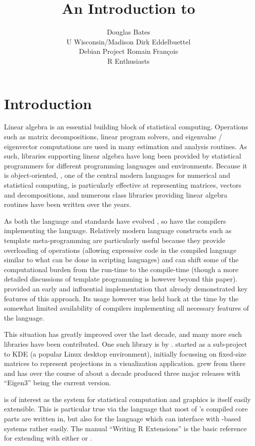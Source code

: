 \documentclass[shortnames,article]{jss}
\author{Douglas Bates\\U Wisconsin/Madison \And Dirk Eddelbuettel\\Debian Project \And Romain Fran\c{c}ois\\R Enthusiasts}
\title{An Introduction to \pkg{RcppEigen}}
\begin{document}

\section{Introduction}
\label{sec:intro}

Linear algebra is an essential building block of statistical
computing.  Operations such as matrix decompositions, linear program
solvers, and eigenvalue / eigenvector computations are used in many
estimation and analysis routines. As such, libraries supporting linear
algebra have long been provided by statistical programmers for
different programming languages and environments.  Because it is
object-oriented, , one of the central modern languages
for numerical and statistical computing, is particularly effective at
representing matrices, vectors and decompositions, and numerous class
libraries providing linear algebra routines have been written over the
years.

As both the  language and standards have evolved
\citep{Meyers:2005:EffectiveC++,Meyers:1995:MoreEffectiveC++}, so have the
compilers implementing the language.  Relatively modern language constructs
such as template meta-programming are particularly useful because they provide
overloading of operations (allowing expressive code in the compiled language
similar to what can be done in scripting languages) and can shift some of the
computational burden from the run-time to the compile-time (though a more
detailed discussions of template programming is however beyond this
paper). \cite{Veldhuizen:1998:Blitz} provided an early and influential
implementation that already demonstrated key features of this approach.  Its
usage however was held back at the time by the somewhat limited availability
of compilers implementing all necessary features of the 
language.

This situation has greatly improved over the last decade, and many more such
libraries have been contributed. One such  library is
 by \citet*{Eigen:Web}.  started as a sub-project to
KDE (a popular Linux desktop environment), initially focussing on fixed-size
matrices to represent projections in a visualization application. 
grew from there and has over the course of about a decade produced three
major releases with ``Eigen3'' being the current version.

 is of interest as the  system for statistical
computation and graphics \citep{R:Main} is itself easily extensible. This is
particular true via the  language that most of 's
compiled core parts are written in, but also for the  language
which can interface with -based systems rather easily. The manual
``Writing R Extensions'' \citep{R:Extensions} is the basic reference for
extending  with either  or .
\end{document}
